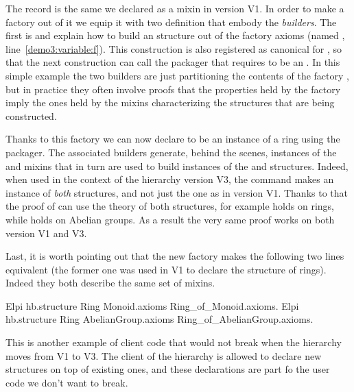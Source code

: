 \documentclass[a4paper,UKenglish,cleveref, autoref]{lipics-v2019}
\newcommand{\mixin}{mixin}
\newcommand{\mixins}{mixins}
\newcommand{\factory}{factory}
\newcommand{\packager}{packager}
\newcommand{\builder}{builder}
\theoremstyle{implem}
\theoremstyle{implem}
\theoremstyle{axiom}
\theoremstyle{abscommand}
\theoremstyle{command}
\begin{document}
The record  is the same we declared as a \mixin{}
in version V1. In order to make a \factory{} out of it we equip it with
two definition that embody the \emph{\builder{}s}.
The first is  and
explain how to build an  structure out of the \factory{}
axioms (named , line~\ref{demo3:variable:f}).
This construction is also registered as canonical for ,
so that the next construction  can call
the  \packager{} that requires  to be
an . In this simple example the two \builder{}s are just
partitioning the contents of the \factory{} , but in practice they
often involve proofs that the properties held by the factory
imply the ones held by the \mixins{} characterizing the structures that are
being constructed.

Thanks to this \factory{} we can now declare  to be an instance
of a ring using the  \packager{}.
The associated \builder{}s generate, behind the scenes, instances of the
 and  \mixins{}
that in turn are used to build instances of the  and 
structures. Indeed, when used in the context of the hierarchy version V3,
the command 
makes  an instance of \emph{both} structures, and not just the 
one as in version V1.
Thanks to that the proof of  can use the theory of
both structures, for example  holds on rings, while  holds
on Abelian groups. As a result the very same proof works on both
version V1 and V3.

Last, it is worth pointing out that the new factory makes the following
two lines equivalent (the former one was used in V1 to declare
the structure of rings). Indeed they both describe the same set of \mixins{}.

\begin{coqcode}
Elpi hb.structure Ring Monoid.axioms Ring_of_Monoid.axioms.
Elpi hb.structure Ring AbelianGroup.axioms Ring_of_AbelianGroup.axioms.
\end{coqcode}

This is another example of client code that would not break when the hierarchy
moves from V1 to V3. The client of the hierarchy is allowed to declare new
structures on top of existing ones, and these declarations are part fo the
user code we don't want to break.
\end{document}
